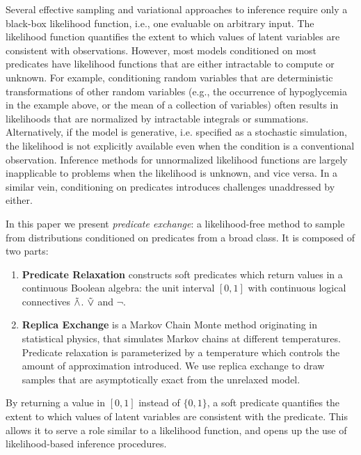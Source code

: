 Several effective sampling  \citep{andrieu2003introduction} and variational  \citep{jordan1999introduction, ranganath2014black} approaches to inference require only a black-box likelihood function, i.e., one evaluable on arbitrary input.
The likelihood function quantifies the extent to which values of latent variables are consistent with observations. 
However, most models conditioned on most predicates have likelihood functions that are either intractable to compute or unknown.
For example, conditioning random variables that are deterministic transformations of other random variables (e.g., the occurrence of hypoglycemia in the example above, or the mean of a collection of variables) often results in likelihoods that are normalized by intractable integrals or summations.	
Alternatively, if the model is generative, i.e. specified as a stochastic simulation, the likelihood is not explicitly available even when the condition is a conventional observation.
Inference methods for unnormalized likelihood functions are largely inapplicable to problems when the likelihood is unknown, and vice versa.
In a similar vein, conditioning on predicates introduces challenges unaddressed by either.

In this paper we present \emph{predicate exchange}:
a likelihood-free method to sample from distributions conditioned on predicates from a broad class.
It is composed of two parts:
\begin{enumerate}
\item \textbf{Predicate Relaxation} constructs soft predicates which return values in a continuous Boolean algebra: the unit interval $[0, 1]$ with continuous logical connectives $\mathrel{\tilde{\land}}$. $\mathrel{\tilde{\lor}}$ and $\neg$.
\item  \textbf{Replica Exchange} is a Markov Chain Monte method originating in statistical physics, that simulates Markov chains at different temperatures.  Predicate relaxation is parameterized by a temperature which controls the amount of approximation introduced.  We use replica exchange to draw samples that are asymptotically exact from the unrelaxed model. 
\end{enumerate}

By returning a value in $[0, 1]$ instead of $\{0, 1\}$, a soft predicate quantifies the extent to which values of latent variables are consistent with the predicate.
This allows it to serve a role similar to a likelihood function, and opens up the use of likelihood-based inference procedures.

